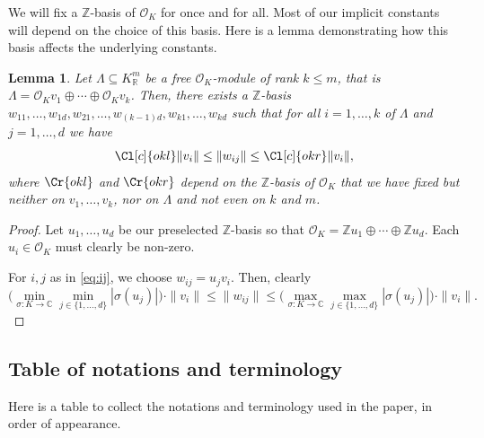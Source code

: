 \documentclass{amsart}
\newtheorem{lemma}[theorem]{Lemma}
\theoremstyle{definition}
\theoremstyle{remark}
\newcommand{\OK}{\mathcal{O}_K}
\newcommand{\KR}{K_\mathbb{R}}
\begin{document}
We will fix a $\mathbb{Z}$-basis of $\OK$ for once and for all. Most of our implicit constants will depend on the choice of this basis. Here is a lemma demonstrating how this basis affects the underlying constants.
\begin{lemma}
    \label{le:basis_of_OK}
    Let $\Lambda \subseteq \KR^{m}$ be a free $\OK$-module of rank $k \leq m$, that is $ \Lambda = \OK v_{1} \oplus  \cdots \oplus \OK v_{k}$. 
    Then, there exists a $\mathbb{Z}$-basis $w_{11},\dots,w_{1d}, w_{21}, \dots, w_{(k-1)d}, w_{k1},\dots,w_{kd}$ such that for all $i=1,\dots,k$ of $\Lambda$
    and $j=1,\dots,d$ we have
    \begin{equation}
        \Cl[c]{okl}\|v_{i}\|\leq \|w_{ij}\| \leq \Cl[c]{okr} \|v_{i}\|,
        \label{eq:ij}
    \end{equation}
    where $\Cr{okl}$ and $\Cr{okr}$ depend on
    the $\mathbb{Z}$-basis of $\OK$ that we have fixed
    but neither on $v_{1},\dots,v_{k}$, nor on $\Lambda$ and not even on $k$ and $m$.
\end{lemma}
\begin{proof}
    Let $u_{1},\dots,u_{d}$ be our preselected $\mathbb{Z}$-basis
    so that $ \OK =  \mathbb{Z} u_{1} \oplus \cdots \oplus  \mathbb{Z}u_{d}$.
    Each $u_{i} \in \OK$ must clearly be non-zero.

    For $i,j$ as in \cref{eq:ij}, we choose
    $w_{ij} = u_{j} v_{i}$. 
    Then, clearly
    \begin{equation}
        \Big(\min_{\sigma: K \rightarrow  \mathbb{C}} \min_{j \in \{1,\dots,d\}}  |\sigma(u_{j})| \Big) \cdot \|v_{i}\|
        \leq
        \|w_{ij}\| 
        \leq \Big(\max_{\sigma: K \rightarrow  \mathbb{C}} \max_{j \in \{1,\dots,d\}}  |\sigma(u_{j})|  \Big)\cdot \|v_{i}\|.
    \end{equation}
\end{proof}

\iffalse
    \subsection{Table of notations and terminology}

    Here is a table to collect the notations and terminology used in the paper, in order of appearance.
\end{document}
